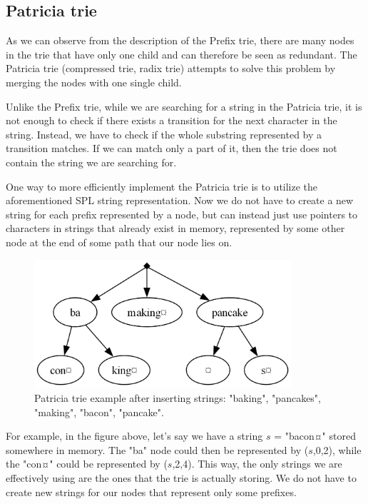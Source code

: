 \documentclass[essay]{fer}
\begin{document}
\subsection{Patricia trie}
\label{sec:patricia_trie}

As we can observe from the description of the Prefix trie, there are many nodes in the trie that have only one child and can therefore be seen as redundant.
The Patricia trie\cite{patricia_ref} (compressed trie, radix trie) attempts to solve this problem by merging the nodes with one single child.

Unlike the Prefix trie, while we are searching for a string in the Patricia trie, it is not enough to check if there exists a transition for the next character in the string. Instead, we have to check if the whole substring represented by a transition matches. If we can match only a part of it, then the trie does not contain the string we are searching for.

One way to more efficiently implement the Patricia trie is to utilize the aforementioned SPL string representation.
Now we do not have to create a new string for each prefix represented by a node, but can instead just use pointers to characters in strings that already exist in memory, represented by some other node at the end of some path that our node lies on.

\begin{figure}[h]
  \label{fig:patricia_example}
  \centering
  \includegraphics[width=0.85\textwidth]{Figures/patricia_trie_small_after_insertion.png}
  \caption{Patricia trie example after inserting strings: "baking", "pancakes", "making", "bacon", "pancake".}
\end{figure}

For example, in the figure above, let's say we have a string $s$ = "bacon¤" stored somewhere in memory. The "ba" node could then be represented by ($s$,0,2), while the "con¤" could be represented by ($s$,2,4). This way, the only strings we are effectively using are the ones that the trie is actually storing. We do not have to create new strings for our nodes that represent only some prefixes.
\end{document}
